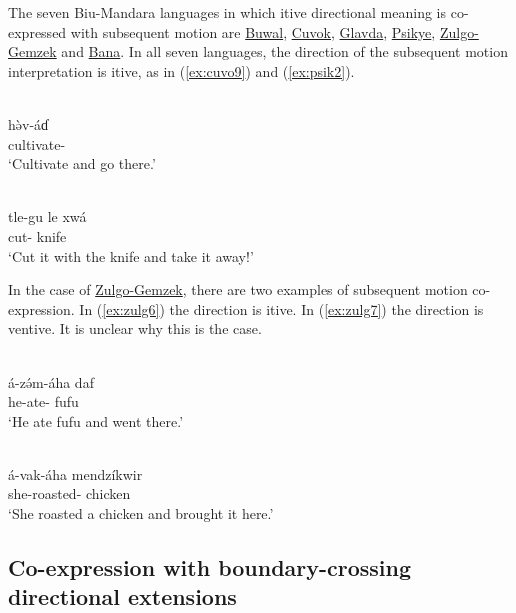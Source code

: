 The seven Biu-Mandara languages in which itive directional meaning is co-expressed with subsequent motion are \hyperref[buwa]{Buwal}, \hyperref[cuvo]{Cuvok}, \hyperref[glav]{Glavda}, \hyperref[psik]{Psikye}, \hyperref[zulg]{Zulgo-Gemzek} and \hyperref[bana]{Bana}. In all seven languages, the direction of the subsequent motion interpretation is itive, as in (\ref{ex:cuvo9}) and (\ref{ex:psik2}). 

\ea\label{ex:cuvo9}
 \\
\gll  hə̀v-áɗ \\
cultivate- \\
\glt `Cultivate and go there.'

\ex\label{ex:psik2}
 \\
\gll  tle-gu le xwá	\\
cut-  knife	\\
\glt `Cut it with the knife and take it away!'
\z

In the case of \hyperref[zulg]{Zulgo-Gemzek}, there are two examples of subsequent motion co-expression. In (\ref{ex:zulg6}) the direction is itive. In (\ref{ex:zulg7}) the direction is ventive. It is unclear why this is the case. 

\ea\label{ex:zulg6}
 \\
\gll á-zə́m-áha daf \\
he-ate- fufu \\
\glt `He ate fufu and went there.'

\ex\label{ex:zulg7}
 \\
\gll á-vak-áha mendzíkwir \\
she-roasted- chicken \\
\glt `She roasted a chicken and brought it here.'
\z 

\subsection{Co-expression with boundary-crossing directional extensions} \label{sec:cobounded}

